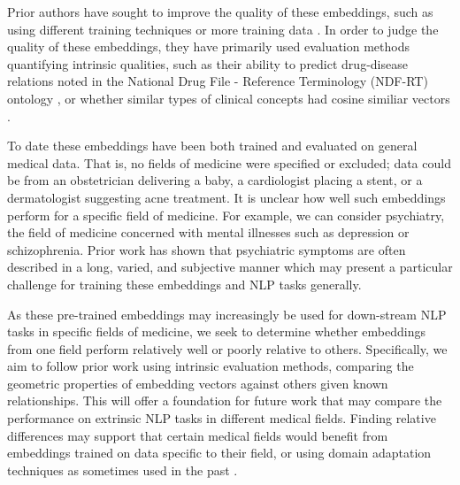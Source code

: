 \documentclass[11pt,a4paper]{article}
\begin{document}
Prior authors have sought to improve the quality of these embeddings, such as using different training techniques or more training data \cite{beamClinicalConceptEmbeddings2018}. In order to judge the quality of these embeddings, they have primarily used evaluation methods quantifying intrinsic qualities, such as their ability to predict drug-disease relations noted in the National Drug File - Reference Terminology (NDF-RT) ontology \cite{minarro-gimenezExploringApplicationDeep2014}, or whether similar types of clinical concepts had cosine similiar vectors  \cite{choiLearningLowDimensionalRepresentations2016}.

To date these embeddings have been both trained and evaluated on general medical data. That is, no fields of medicine were specified or excluded; data could be from an obstetrician delivering a baby, a cardiologist placing a stent, or a dermatologist suggesting acne treatment. It is unclear how well such embeddings perform for a specific field of medicine. For example, we can consider psychiatry, the field of medicine concerned with mental illnesses such as depression or schizophrenia. Prior work has shown that psychiatric symptoms are often described in a long, varied, and subjective manner \cite{forbushSittingPinsNeedles2013} which may present a particular challenge for training these embeddings and NLP tasks generally.

As these pre-trained embeddings may increasingly be used for down-stream NLP tasks in specific fields of medicine, we seek to determine whether embeddings from one field perform relatively well or poorly relative to others. Specifically, we aim to follow prior work using intrinsic evaluation methods, comparing the geometric properties of embedding vectors against others given known relationships. This will offer a foundation for future work that may compare the performance on extrinsic NLP tasks in different medical fields. Finding relative differences may support that certain medical fields would benefit from embeddings trained on data specific to their field, or using domain adaptation techniques as sometimes used in the past \cite{yuRetrofittingConceptVector2017}. 
\end{document}
